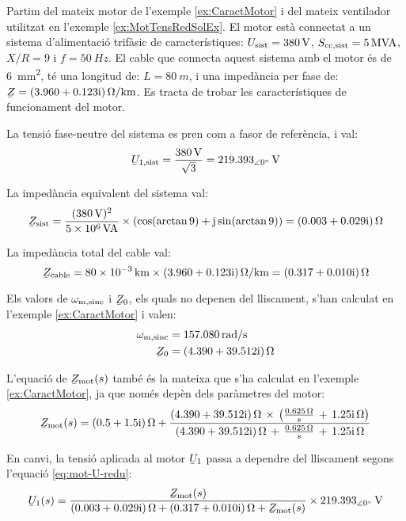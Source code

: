 \begin{exemple}\label{ex:MotTensRedIarr}
	\addcontentsxms{\MotTensRedIarr}
	Partim del mateix motor de l'exemple \vref{ex:CaractMotor} i del mateix ventilador utilitzat en l'exemple \vref{ex:MotTensRedSolEx}. El motor està connectat a un sistema d'alimentació trifàsic de característiques: $U_\mathrm{sist}=\qty{380}{V}$, $S_\mathrm{cc,sist}=\qty{5}{MVA}$, $X/R=9$ i $f=\qty{50}{Hz}$. El cable que connecta aquest sistema amb el motor és de \qty{6}{mm^2}, té una longitud de:  $L=\qty{80}{m}$, i una impedància per fase de: $\cmplx{Z} = \complexqty{3,960+j0,123}{\ohm/km}$. Es tracta de trobar les característiques de funcionament del motor.
	
	La tensió fase-neutre del sistema es pren com a fasor de referència, i val:
	\[
		\cmplx{U}\ped{1,sist} = \frac{\qty{380}{V}}{\sqrt{3}} = \qtypd{219,393}{0}{V}
	\]
	
	La impedància equivalent del sistema val:
	\[
		\cmplx{Z}\ped{sist} = \frac{(\qty{380}{V})^2}{\qty{5e6}{VA}} \times (\cos(\arctan 9) + \ju \sin(\arctan 9)) = \complexqty{0,003+j0,029}{\ohm}	
	\]
	
	La impedància total del cable val:
	\[
		\cmplx{Z}\ped{cable} = \qty{80e-3}{km} \times \complexqty{3,960+j0,123}{\ohm/km} = \complexqty{0,317+j0,010}{\ohm}
	\]
	
	Els valors de $\omega_\mathrm{m,sinc}$ i $\cmplx{Z}_0$, els quals no depenen del lliscament, s'han calculat en  l'exemple \ref{ex:CaractMotor} i valen:
	\begin{align*}
		\omega\ped{m,sinc} &=  \qty{157,080}{rad/s} \\
		\cmplx{Z}_0 &=  \complexqty{4,390+j39,512}{\ohm} 
	\end{align*}
		
	L'equació de $\cmplx{Z}\ped{mot}(s)$ també és la mateixa que s'ha calculat en l'exemple  \ref{ex:CaractMotor}, ja que només depèn dels paràmetres del motor:
	\[
		\cmplx{Z}\ped{mot}(s) = \complexqty{0,5+j1,5}{\ohm} + \frac{\complexqty{4,390+j39,512}{\ohm}\,\times\,
		\left(\tfrac{\qty{0,625}{\ohm}}{s}\, + \, \complexqty{j1,25}{\ohm}\right)}{\complexqty{4,390+j39,512}{\ohm}\,+\,
		\tfrac{\qty{0,625}{\ohm}}{s}\, + \,\complexqty{j1,25}{\ohm}}  
	\] 
	
	En canvi, la tensió aplicada al motor $\cmplx{U}_1$ passa a dependre del lliscament segons l'equació \eqref{eq:mot-U-redu}:
	\[
		\cmplx{U}_1(s) = \frac{\cmplx{Z}\ped{mot}(s)}{\complexqty{0,003+j0,029}{\ohm} + \complexqty{0,317+j0,010}{\ohm}  +  \cmplx{Z}\ped{mot}(s)} \times \qtypd{219,393}{0}{V}
	\]
	

\end{exemple}
